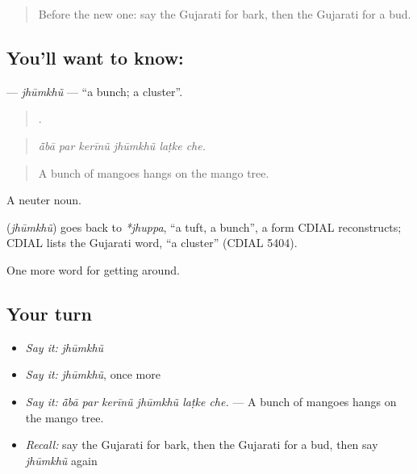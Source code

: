 \begin{quote}
Before the new one: say the Gujarati for bark, then the Gujarati for a bud.
\end{quote}

\subsection*{You'll want to know: }
\textbf{} — \emph{jhūmkhũ} — \textquotedblleft{}a bunch; a cluster\textquotedblright{}.

\begin{quote}
     .
\end{quote}

\begin{quote}
\emph{ā̃bā par kerīnũ jhūmkhũ laṭke che.}
\end{quote}

\begin{quote}
A bunch of mangoes hangs on the mango tree.
\end{quote}

A neuter noun.

\begin{cousinweb}
\textbf{} (\emph{jhūmkhũ}) goes back to \emph{*jhuppa}, \textquotedblleft{}a tuft, a bunch\textquotedblright{}, a form CDIAL reconstructs; CDIAL lists the Gujarati word, \textquotedblleft{}a cluster\textquotedblright{} (CDIAL 5404).
\end{cousinweb}

\begin{grammarlens}[title={What you've built}]
One more word for getting around.
\end{grammarlens}

\subsection*{Your turn}
\begin{itemize}
\raggedright
  \item \emph{Say it:} \emph{jhūmkhũ}
  \item \emph{Say it:} \emph{jhūmkhũ}, once more
  \item \emph{Say it:} \emph{ā̃bā par kerīnũ jhūmkhũ laṭke che.} — A bunch of mangoes hangs on the mango tree.
  \item \emph{Recall:} say the Gujarati for bark, then the Gujarati for a bud, then say \emph{jhūmkhũ} again
\end{itemize}

